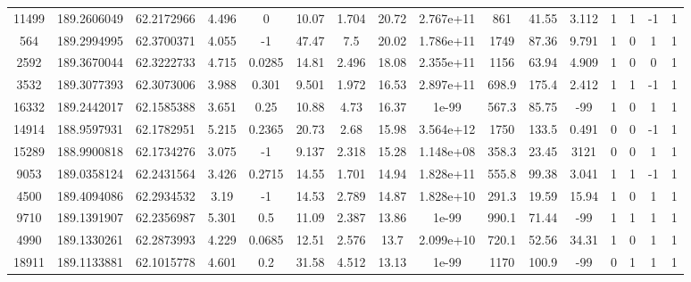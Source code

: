 \begin{table*}
\begin{center}
\begin{tabular}{ cccccccccccccccc }
       11499 & 189.2606049 &  62.2172966 &  4.496 &      0 &     10.07 &     1.704 &     20.72 & 2.767e+11 &       861 &     41.55 &     3.112 &      1 &      1 &     -1 &        1 \\ 
         564 & 189.2994995 &  62.3700371 &  4.055 &     -1 &     47.47 &       7.5 &     20.02 & 1.786e+11 &      1749 &     87.36 &     9.791 &      1 &      0 &      1 &        1 \\ 
        2592 & 189.3670044 &  62.3222733 &  4.715 & 0.0285 &     14.81 &     2.496 &     18.08 & 2.355e+11 &      1156 &     63.94 &     4.909 &      1 &      0 &      0 &        1 \\ 
        3532 & 189.3077393 &  62.3073006 &  3.988 &  0.301 &     9.501 &     1.972 &     16.53 & 2.897e+11 &     698.9 &     175.4 &     2.412 &      1 &      1 &     -1 &        1 \\ 
       16332 & 189.2442017 &  62.1585388 &  3.651 &   0.25 &     10.88 &      4.73 &     16.37 &     1e-99 &     567.3 &     85.75 &       -99 &      1 &      0 &      1 &        1 \\ 
       14914 & 188.9597931 &  62.1782951 &  5.215 & 0.2365 &     20.73 &      2.68 &     15.98 & 3.564e+12 &      1750 &     133.5 &     0.491 &      0 &      0 &     -1 &        1 \\ 
       15289 & 188.9900818 &  62.1734276 &  3.075 &     -1 &     9.137 &     2.318 &     15.28 & 1.148e+08 &     358.3 &     23.45 &      3121 &      0 &      0 &      1 &        1 \\ 
        9053 & 189.0358124 &  62.2431564 &  3.426 & 0.2715 &     14.55 &     1.701 &     14.94 & 1.828e+11 &     555.8 &     99.38 &     3.041 &      1 &      1 &     -1 &        1 \\ 
        4500 & 189.4094086 &  62.2934532 &   3.19 &     -1 &     14.53 &     2.789 &     14.87 & 1.828e+10 &     291.3 &     19.59 &     15.94 &      1 &      0 &      1 &        1 \\ 
        9710 & 189.1391907 &  62.2356987 &  5.301 &    0.5 &     11.09 &     2.387 &     13.86 &     1e-99 &     990.1 &     71.44 &       -99 &      1 &      1 &      1 &        1 \\ 
        4990 & 189.1330261 &  62.2873993 &  4.229 & 0.0685 &     12.51 &     2.576 &      13.7 & 2.099e+10 &     720.1 &     52.56 &     34.31 &      1 &      0 &      1 &        1 \\ 
       18911 & 189.1133881 &  62.1015778 &  4.601 &    0.2 &     31.58 &     4.512 &     13.13 &     1e-99 &      1170 &     100.9 &       -99 &      0 &      1 &      1 &        1 \\ 

\end{tabular}
\end{center}
\end{table*}
